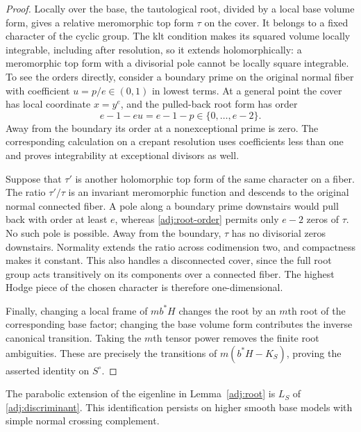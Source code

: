 \begin{proof}
Locally over the base, the tautological root, divided by a local base
volume form, gives a relative meromorphic top form $\tau$ on the cover.
It belongs to a fixed character of the cyclic group.  The klt condition
makes its squared volume locally integrable, including after resolution,
so it extends holomorphically: a meromorphic top form with a divisorial
pole cannot be locally square integrable.
To see the orders directly, consider a boundary prime on the original
normal fiber with coefficient $u=p/e\in(0,1)$ in lowest terms.  At a
general point the cover has local coordinate $x=y^e$, and the pulled-back
root form has order
\begin{equation}
\label{adj:root-order}
                         e-1-eu=e-1-p\in\{0,\ldots,e-2\}.
\end{equation}
Away from the boundary its order at a nonexceptional prime is zero.
The corresponding calculation on a crepant resolution uses coefficients
less than one and proves integrability at exceptional divisors as well.

Suppose that $\tau'$ is another holomorphic top form of the same
character on a fiber.  The ratio $\tau'/\tau$ is an invariant meromorphic
function and descends to the original normal connected fiber.
A pole along a boundary prime downstairs would pull back with order at
least $e$, whereas \eqref{adj:root-order} permits only $e-2$ zeros of
$\tau$.  No such pole is possible.  Away from the boundary, $\tau$ has
no divisorial zeros downstairs.  Normality extends the ratio across
codimension two, and compactness makes it constant.  This also handles
a disconnected cover, since the full root group acts transitively on
its components over a connected fiber.  The highest Hodge piece of the
chosen character is therefore one-dimensional.

Finally, changing a local frame of $m b^*H$ changes the root by an
$m$th root of the corresponding base factor; changing the base volume
form contributes the inverse canonical transition.  Taking the $m$th tensor power removes
the finite root ambiguities.  These are precisely the transitions of
$m(b^*H-K_S)$, proving the asserted identity on $S^\circ$.
\end{proof}

\begin{lemma}
\label{adj:extension}
The parabolic extension of the eigenline in Lemma~\ref{adj:root} is $L_S$
of \eqref{adj:discriminant}.  This identification persists on higher
smooth base models with simple normal crossing complement.
\end{lemma}

